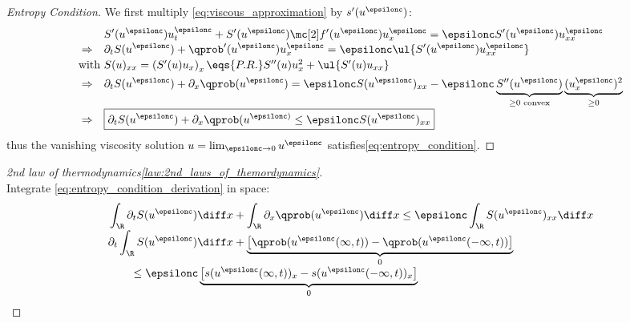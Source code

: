 \begin{proofbox}\nospacing
    \begin{proof}[Entropy Condition]\label{proof:defn:entropy_condition}
        We first multiply \cref{eq:viscous_approximation} by $s'(u^{\epsilonc})$:
        \begin{align}
          &&&S'(u^{\epsilonc})u_{t}^{\epsilonc}+S'(u^{\epsilonc})\flux'(u^{\epsilonc})u_{x}^{\epsilonc}=\epsilonc S'(u^{\epsilonc})u_{xx}^{\epsilonc}\nonumber\\[-1\jot]
          &\Rightarrow&&
          \partial_{t}S(u^{\epsilonc})+\qprob'(u^{\epsilonc})u_{x}^{\epsilonc}=\epsilonc\ul{S'(u^{\epsilonc})u_{xx}^{\epsilonc}}\nonumber\\[-1\jot]
          \intertext{with $S(u)_{xx}=\left(S'(u)u_{x}\right)_{x}\eqs{P.R.}S''(u)u_{x}^{2}+\ul{S'(u)u_{xx}}$}
          &\Rightarrow&&\partial_{t}S(u^{\epsilonc})+\partial_{x}\qprob(u^{\epsilonc})=\epsilonc S(u^{\epsilonc})_{xx}-\epsilonc\underbrace{S''(u^{\epsilonc})}_{\geq0\text{ convex}}\underbrace{(u_{x}^{\epsilonc})^{2}}_{\geq0}\nonumber\\[-1\jot]
          &\Rightarrow&&\boxed{\partial_{t}S(u^{\epsilonc})+\partial_{x}\qprob(u^{\epsilonc)}\leq\epsilonc S(u^{\epsilonc})_{xx}}\label{eq:entropy_condition_derivation}
        \end{align}
        thus the vanishing viscosity solution $u=\lim_{\epsilonc\to0}u^{\epsilonc}$ satisfies\cref{eq:entropy_condition}.
    \end{proof}
\end{proofbox}
\begin{proofbox}\nospacing
    \begin{proof}[2nd law of thermodynamics\cref{law:2nd_laws_of_themordynamics}]\label{proof:law:2nd_laws_of_themordynamics}\leavevmode\\
        Integrate \cref{eq:entropy_condition_derivation} in space:
        \begin{align*}
           &\int_{\R}\partial_{t}S(u^{\epsilonc})\diff x+\int_{\R}\partial_{x}\qprob(u^{\epsilonc})\diff x\leq\epsilonc\int_{\R} S(u^{\epsilonc})_{xx}\diff x \\[-1\jot]
          &\partial_{t}\int_{\R}S(u^{\epsilonc})\diff x+\underbrace{\left[\qprob(u^{\epsilonc}(\infty,t))-\qprob(u^{\epsilonc}(-\infty,t))\right]}_{0}\\[-1\jot]
            &\qquad\leq\epsilonc \underbrace{\left[s(u^{\epsilonc}(\infty,t))_{x}-s(u^{\epsilonc}(-\infty,t))_{x}\right]}_{0}
        \end{align*}
    \end{proof}
\end{proofbox}
